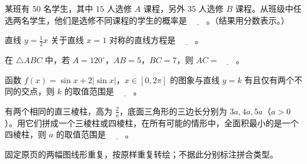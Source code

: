 \begin{question}
某班有 $50$ 名学生，其中 $15$ 人选修 $A$ 课程，另外 $35$ 人选修 $B$ 课程。从班级中任选两名学生，他们是选修不同课程的学生的概率是 $\underline{\qquad}$。（结果用分数表示。）

\end{question}
\begin{question}
直线 $y=\frac12x$ 关于直线 $x=1$ 对称的直线方程是 $\underline{\qquad}$。

\end{question}
\begin{question}
在 $\triangle ABC$ 中，若 $A=120^\circ$，$AB=5$，$BC=7$，则 $AC=\underline{\qquad}$。

\end{question}
\begin{question}
函数 $f(x)=\sin x+2|\sin x|$，$x\in[0,2\pi]$ 的图象与直线 $y=k$ 有且仅有两个不同的交点，则 $k$ 的取值范围是 $\underline{\qquad}$。

\Needspace{0.4\textheight}
\end{question}
\begin{question}
有两个相同的直三棱柱，高为 $\frac2a$，底面三角形的三边长分别为 $3a,4a,5a$（$a>0$）。用它们拼成一个三棱柱或四棱柱，在所有可能的情形中，全面积最小的是一个四棱柱，则 $a$ 的取值范围是 $\underline{\qquad}$。
\nopagebreak[4]
\begin{center}\end{center}
\nopagebreak[4]
\begin{gktip}
固定原页的两幅图线形重复，按原样重复转绘；不据此分别标注拼合类型。
\end{gktip}

\end{question}

